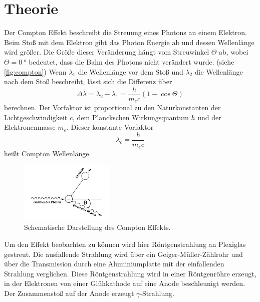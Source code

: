 \section{Theorie}
\label{sec:Theorie}




Der Compton Effekt beschreibt die Streuung eines Photons an einem Elektron.
Beim Stoß mit dem Elektron gibt das Photon Energie ab und dessen Wellenlänge wird größer.
Die Größe dieser Veränderung hängt vom Streuwinkel $\Theta$ ab, wobei $\Theta=\SI{0}{\degree}$ bedeutet, dass die Bahn des Photons nicht verändert wurde. (siehe \autoref{fig:compton})
Wenn $\lambda_1$ die Wellenlänge vor dem Stoß und $\lambda_2$ die Wellenlänge nach dem Stoß beschreibt, lässt sich die Differenz über
\begin{equation}
    \Delta \lambda = \lambda_2 - \lambda_1 = \frac{h}{m_e c}(1-\cos \Theta)
    \label{eq:differenz}
\end{equation}
berechnen.
Der Vorfaktor ist proportional zu den Naturkonstanten der Lichtgeschwindigkeit $c$, dem Planckschen Wirkungsquantum $h$ und der Elektronenmasse $m_e$.
Dieser konstante Vorfaktor 
\begin{equation}
    \lambda_c = \frac{h}{m_e c}
    \label{eq:compton-wellenlänge}
\end{equation}
heißt Compton Wellenlänge.

\begin{figure}
    \centering
    \includegraphics[width=0.4\textwidth]{images/bild_1.png}
    \caption{Schematische Darstellung des Compton Effekts.\cite{V603}}
    \label{fig:compton}
\end{figure}

Um den Effekt beobachten zu können wird hier Röntgenstrahlung an Plexiglas gestreut. 
Die ausfallende Strahlung wird über ein Geiger-Müller-Zählrohr und über die Transmission durch eine Aluminiumplatte mit der einfallenden Strahlung verglichen.
Diese Röntgenstrahlung wird in einer Röntgenröhre erzeugt, in der Elektronen von einer Glühkathode auf eine Anode beschleunigt werden. 
Der Zusammenstoß auf der Anode erzeugt $\gamma$-Strahlung.

